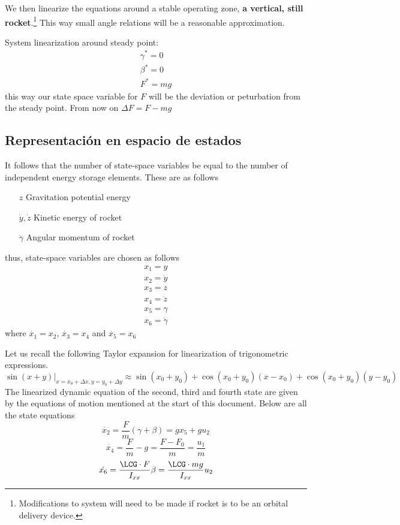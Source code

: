 We then linearize the equations around a stable operating zone, \textbf{a vertical, still rocket}.\footnote{Modifications to system will need to be made if rocket is to be an orbital delivery device.} This way  small angle relations will be a reasonable approximation.

System linearization around steady point:
\begin{align*}
	\gamma^* = 0 \\
	\beta^* = 0 \\
	F^* = mg
\end{align*}
this way our state space variable for $F$ will be the deviation or peturbation from the steady point. From now on $\Delta F = F- mg$
\subsection{Representación en espacio de estados}
It follows that the number of state-space variables be equal to the number of independent energy storage elements. These are as follows

\begin{enumerate}
	\item[$z$] Gravitation potential energy
	\item[$\dot{y},\dot{z}$] Kinetic energy of rocket
	\item[$\dot{\gamma}$] Angular momentum of rocket
\end{enumerate}
thus, state-space variables are chosen as follows
\begin{align*}
	x_1 = y \\
	x_2 = \dot{y} \\
	x_3 = z \\
	x_4 = \dot{z} \\
	x_5 = \gamma \\
	x_6 = \dot{\gamma}
\end{align*}
where $\dot{x_1} = x_2$, $\dot{x_3} = x_4$ and $\dot{x_5} = x_6$

Let us recall the following Taylor expansion for linearization of trigonometric expressions.
\[
\sin(x+y)|_{x=x_0+\Delta x,y=y_0+\Delta y} \approx \sin(x_0+y_0) + \cos(x_0 + y_0) (x-x_0) + \cos(x_0 + y_0) (y-y_0)
\]
The linearized dynamic equation of the second, third and fourth state are given by the equations of motion mentioned at the start of this document. Below are all the state equations
\begin{equation}
	\dot{x_2} = \frac{F}{m} \left( \gamma+\beta \right) = g x_5 + g u_2 
\end{equation}
\begin{equation}
\dot{x_4} = \frac{F}{m} - g =\frac{F-F_0}{m}= \frac{u_1}{m}
\end{equation}
\begin{equation}
\dot{x_6} = \frac{\LCG \cdot F}{I_{xx}} \beta = \frac{\LCG \cdot mg}{I_{xx}} u_2 
\end{equation}

